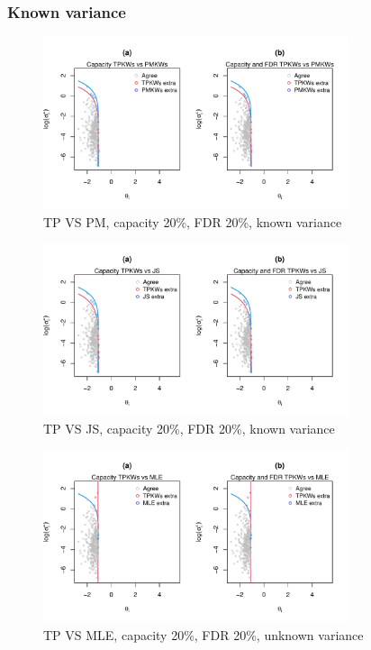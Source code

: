 \documentclass[12pt]{article}
\begin{document}
\newpage
\subsubsection{Known variance}
\label{section:known}
\begin{figure}[h!]
    \centering
    \includegraphics[width=0.8\textwidth]{../../Figures/2013-2022/GMM_m/GLmix/Contour_Left_0.2_0.2_TPKWs_PMKWs.pdf}
    \caption{TP VS PM,  capacity 20\%, FDR 20\%, known variance}
\end{figure}

\begin{figure}[h!]
    \centering
    \includegraphics[width=0.8\textwidth]{../../Figures/2013-2022/GMM_m/GLmix/Contour_Left_0.2_0.2_TPKWs_JS.pdf}
    \caption{TP VS JS, capacity 20\%, FDR 20\%, known variance}
\end{figure}

\begin{figure}[h!]
    \centering
    \includegraphics[width=0.8\textwidth]{../../Figures/2013-2022/GMM_m/GLmix/Contour_Left_0.2_0.2_TPKWs_MLE.pdf}
    \caption{TP VS MLE, capacity 20\%, FDR 20\%, unknown variance}
\end{figure}
\end{document}
